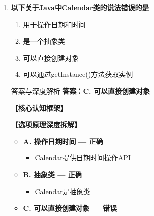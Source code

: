 \documentclass[12pt, a4paper]{ctexart}
\begin{document}
\begin{enumerate}[label=\textbf{\arabic*.}]
\begin{bluebox}{答案与深度解析}
\begin{itemize}[label={}, leftmargin=*, nosep]
\begin{itemize}[label={}, nosep]
		      
					  \end{itemize}
					  \end{itemize}
\textbf{【应背诵知识点】}

		      random()方法：
		      \begin{itemize}[label={}, nosep]
			      \item Math.random()：返回[0.0, 1.0)
			      \item Random类：nextInt(n)返回[0, n)
			      \item 生成指定范围随机数：(int)(Math.random() * n)
		      \end{itemize}
	      \end{bluebox}

	      \vspace{1em}

	\item \textbf{以下关于Java中Calendar类的说法错误的是}
	      \begin{enumerate}[label=\Alph*.]
		      \item 用于操作日期和时间
		      \item 是一个抽象类
		      \item 可以直接创建对象
		      \item 可以通过getInstance()方法获取实例
	      \end{enumerate}

	      \begin{bluebox}{答案与深度解析}
		      \textbf{答案：C. 可以直接创建对象}

		      \textbf{【核心认知框架】}

		      \textbf{【选项原理深度拆解】}
					  \begin{itemize}[label={}, leftmargin=*, nosep]


		      \item \textbf{A. 操作日期时间 — 正确}
					  \begin{itemize}[label={}, nosep]
		      
			      \item Calendar提供日期时间操作API
		      

					  \end{itemize}
		      \item \textbf{B. 抽象类 — 正确}
					  \begin{itemize}[label={}, nosep]
		      
			      \item Calendar是抽象类
		      

					  \end{itemize}
		      \item \textbf{C. 可以直接创建对象 — 错误}
					  \begin{itemize}[label={}, nosep]
		      

\end{itemize}
\end{itemize}
\end{bluebox}
\end{enumerate}
\end{document}

